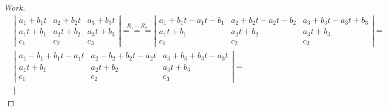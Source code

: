 \documentclass{article}
\begin{document}
\begin{proof}[Work]
    \begin{align*}
         & \left\lvert \begin{array}{ccc}
                           a_1 + b_1t & a_2 + b_2t & a_3 + b_3t \\
                           a_1t + b_1 & a_2t + b_2 & a_3t + b_3 \\
                           c_1        & c_2        & c_3
                       \end{array} \right\rvert \overset{R_1 - R_2}{===}
        \left\lvert \begin{array}{ccc}
                        a_1 + b_1t - a_1t - b_1 & a_2 + b_2t - a_2t - b_2 & a_3 + b_3t - a_3t + b_3 \\
                        a_1t + b_1              & a_2t + b_2              & a_3t + b_3              \\
                        c_1                     & c_2                     & c_3
                    \end{array} \right\rvert =                   \\
         & \left\lvert \begin{array}{ccc}
                           a_1 - b_1 + b_1t - a_1t & a_2 - b_2 + b_2t - a_2t & a_3 + b_3 + b_3t - a_3t \\
                           a_1t + b_1              & a_2t + b_2              & a_3t + b_3              \\
                           c_1                     & c_2                     & c_3
                       \end{array} \right\rvert =                \\
         & \left\lvert \begin{array}{ccc}

\end{array}
\end{align*}
\end{proof}
\end{document}
